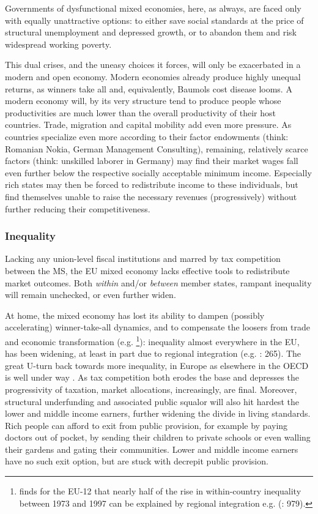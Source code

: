 \documentclass[11pt,a4paper,oneside,openright]{article}
\begin{document}
Governments of dysfunctional mixed economies, here, as always, are faced only with equally unattractive options: 
to either save social standards at the price of structural unemployment and depressed growth, or to abandon them and risk widespread working poverty.

This dual crises, and the uneasy choices it forces, will only be exacerbated in a modern and open economy. 
Modern economies already produce highly unequal returns, as winners take all and, equivalently, Baumols cost disease looms. 
A modern economy will, by its very structure tend to produce people whose productivities are much lower than the overall productivity of their host countries. 
Trade, migration and capital mobility add even more pressure. 
As countries specialize even more according to their factor endowments (think: Romanian Nokia, German Management Consulting), remaining, relatively scarce factors (think: unskilled laborer in Germany) may find their market wages fall even further below the respective socially acceptable minimum income. 
Especially rich states may then be forced to redistribute income to these individuals, but find themselves unable to raise the necessary revenues (progressively) without further reducing their competitiveness. 


\subsubsection{Inequality} Lacking any union-level fiscal institutions and marred by tax competition between the \gls{MS}, the \gls{EU} mixed economy lacks effective tools to redistribute market outcomes. 
Both \emph{within} and/or \emph{between} member states, rampant inequality will remain unchecked, or even further widen.

At home, the mixed economy has lost its ability to dampen (possibly accelerating) winner-take-all dynamics, and to compensate the loosers from trade and economic transformation (e.g. \citealt{Beckfield2006}\footnote{
	\citeauthor{Beckfield2006} finds for the \gls{EU}-12 that nearly half of the rise in within-country inequality between 1973 and 1997 can be explained by regional integration e.g. (\citeyear{Beckfield2006}: 979).}): 
inequality almost everywhere in the \gls{EU}, has been widening, at least in part due to regional integration (e.g. \citealt{DaudUngl2008}: 265). 
The great U-turn back towards more inequality, in Europe as elsewhere in the \gls{OECD} is well under way \citep{AldersonNielsen-2002-aa}. 
As tax competition both erodes the base and depresses the progressivity of taxation, market allocations, increasingly, are final. 
Moreover, structural underfunding and associated public squalor will also hit hardest the lower and middle income earners, further widening the divide in living standards. 
Rich people can afford to exit from public provision, for example by paying doctors out of pocket, by sending their children to private schools or even walling their gardens and gating their communities. 
Lower and middle income earners have no such exit option, but are stuck with decrepit public provision.
\end{document}
